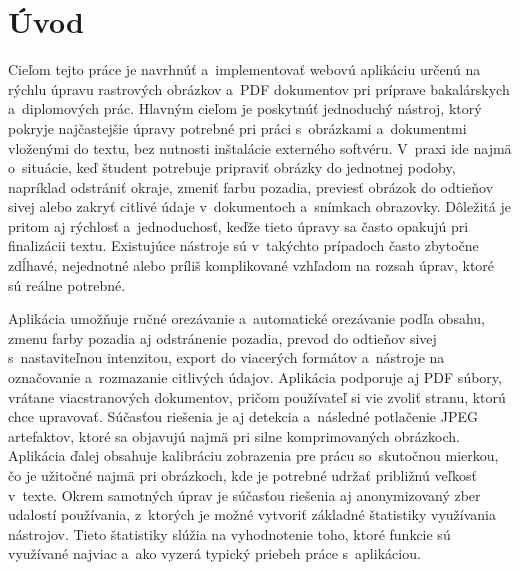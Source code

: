 \chapter{Úvod}
\label{uvod}

Cieľom tejto práce je navrhnúť a~implementovať webovú aplikáciu určenú na rýchlu úpravu rastrových obrázkov a~PDF dokumentov pri príprave bakalárskych a~diplomových prác. Hlavným cieľom je poskytnúť jednoduchý nástroj, ktorý pokryje najčastejšie úpravy potrebné pri práci s~obrázkami a~dokumentmi vloženými do textu, bez nutnosti inštalácie externého softvéru. V~praxi ide najmä o~situácie, keď študent potrebuje pripraviť obrázky do jednotnej podoby, napríklad odstrániť okraje, zmeniť farbu pozadia, previesť obrázok do odtieňov sivej alebo zakryť citlivé údaje v~dokumentoch a~snímkach obrazovky. Dôležitá je pritom aj rýchlosť a~jednoduchosť, keďže tieto úpravy sa často opakujú pri finalizácii textu. Existujúce nástroje sú v~takýchto prípadoch často zbytočne zdĺhavé, nejednotné alebo príliš komplikované vzhľadom na rozsah úprav, ktoré sú reálne potrebné.

Aplikácia umožňuje ručné orezávanie a~automatické orezávanie podľa obsahu, zmenu farby pozadia aj odstránenie pozadia, prevod do odtieňov sivej s~nastaviteľnou intenzitou, export do viacerých formátov a~nástroje na označovanie a~rozmazanie citlivých údajov. Aplikácia podporuje aj PDF súbory, vrátane viacstranových dokumentov, pričom používateľ si vie zvoliť stranu, ktorú chce upravovať. Súčasťou riešenia je aj detekcia a~následné potlačenie JPEG artefaktov, ktoré sa objavujú najmä pri silne komprimovaných obrázkoch. Aplikácia ďalej obsahuje kalibráciu zobrazenia pre prácu so~skutočnou mierkou, čo je užitočné najmä pri obrázkoch, kde je potrebné udržať približnú veľkosť v~texte. Okrem samotných úprav je súčasťou riešenia aj anonymizovaný zber udalostí používania, z~ktorých je možné vytvoriť základné štatistiky využívania nástrojov. Tieto štatistiky slúžia na vyhodnotenie toho, ktoré funkcie sú využívané najviac a~ako vyzerá typický priebeh práce s~aplikáciou.

